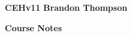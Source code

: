 \noindent
\textbf{CEHv11} \hfill \textbf{Brandon Thompson} \\

\begin{center}
\textbf{Course Notes}
\end{center}